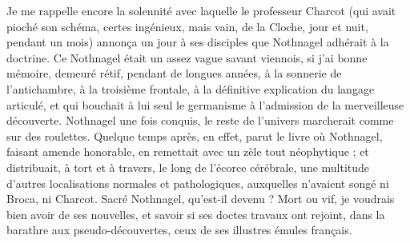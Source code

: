 \documentclass[french,twoside]{book} %
\begin{document}
Je me rappelle encore la solennité avec laquelle le professeur Charcot (qui avait pioché son schéma, certes ingénieux, mais vain, de la Cloche, jour et nuit, pendant un mois) annonça un jour à ses disciples que Nothnagel adhérait à la doctrine. Ce Nothnagel était un assez vague savant viennois, si j’ai bonne mémoire, demeuré rétif, pendant de longues années, à la sonnerie de l’antichambre, à la troisième frontale, à la définitive explication du langage articulé, et qui bouchait à lui seul le germanisme à l’admission de la merveilleuse découverte. Nothnagel une fois conquis, le reste de l’univers marcherait comme sur des roulettes. Quelque temps après, en effet, parut le livre où Nothnagel, faisant amende honorable, en remettait avec un zèle tout néophytique ; et distribuait, à tort et à travers, le long de l’écorce cérébrale, une multitude d’autres localisations normales et pathologiques, auxquelles n’avaient songé ni Broca, ni Charcot. Sacré Nothnagel, qu’est-il devenu ? Mort ou vif, je voudrais bien avoir de ses nouvelles, et savoir si ses doctes travaux ont rejoint, dans la barathre aux pseudo-découvertes, ceux de ses illustres émules français.\par
\end{document}
